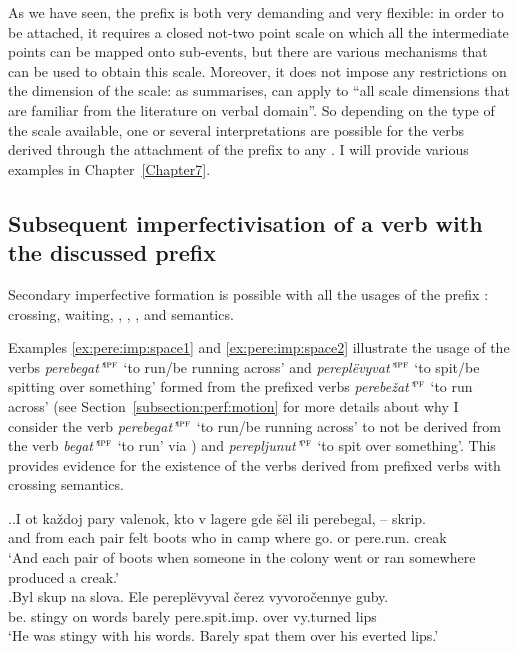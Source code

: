 As we have seen, the prefix  is both very demanding and very flexible: in order to be attached, it requires a closed not-two point scale on which all the intermediate points can be mapped onto sub-events, but there are various mechanisms that can be used to obtain this scale. Moreover, it does not impose any restrictions on the dimension of the scale: as \citet[151]{Kagan:book} summarises,  can apply to ``all scale dimensions that are familiar from the literature on verbal domain''. So depending on the type of the scale available, one or several interpretations are possible for the verbs derived through the attachment of the prefix  to any . I will provide various examples in Chapter~\ref{Chapter7}.

\subsection{Subsequent imperfectivisation of a verb with the discussed prefix}
Secondary imperfective formation is possible with all the usages of the prefix : crossing, waiting, , , , and  semantics.

Examples \ref{ex:pere:imp:space1} and \ref{ex:pere:imp:space2} illustrate the usage of the  verbs \textit{perebegat'}$^{\textsc{ipf}}$ `to run/be running across' and \textit{perepl\"{e}vyvat'}$^{\textsc{ipf}}$ `to spit/be spitting over something' formed from the prefixed verbs \textit{perebe\v{z}at'}$^{\textsc{pf}}$ `to run across' (see Section~\ref{subsection:perf:motion} for more details about why I consider the verb \textit{pe\-re\-be\-gat'}$^{\textsc{ipf}}$ `to run/be running across' to not be derived from the verb \textit{begat'}$^{\textsc{ipf}}$ `to run' via ) and \textit{perepljunut'}$^{\textsc{pf}}$ `to spit over something'. This provides evidence for the existence of the  verbs derived from prefixed verbs with crossing semantics.

\ex.\ag.\label{ex:pere:imp:space1}I ot ka\v{z}doj pary valenok, kto v lagere gde \v{s}\"{e}l ili perebegal, -- skrip.\\
and from each pair {felt boots} who in camp where go. or pere.run. {} creak\\
\trans `And each pair of boots when someone in the colony went or ran somewhere produced a creak.'\\
\bg.\label{ex:pere:imp:space2}Byl skup na slova. Ele perepl\"{e}vyval \v{c}erez vyvoro\v{c}ennye guby.\\
be. stingy on words barely pere.spit.imp. over vy.turned lips\\
\trans `He was stingy with his words. Barely spat them over his everted lips.'\\

